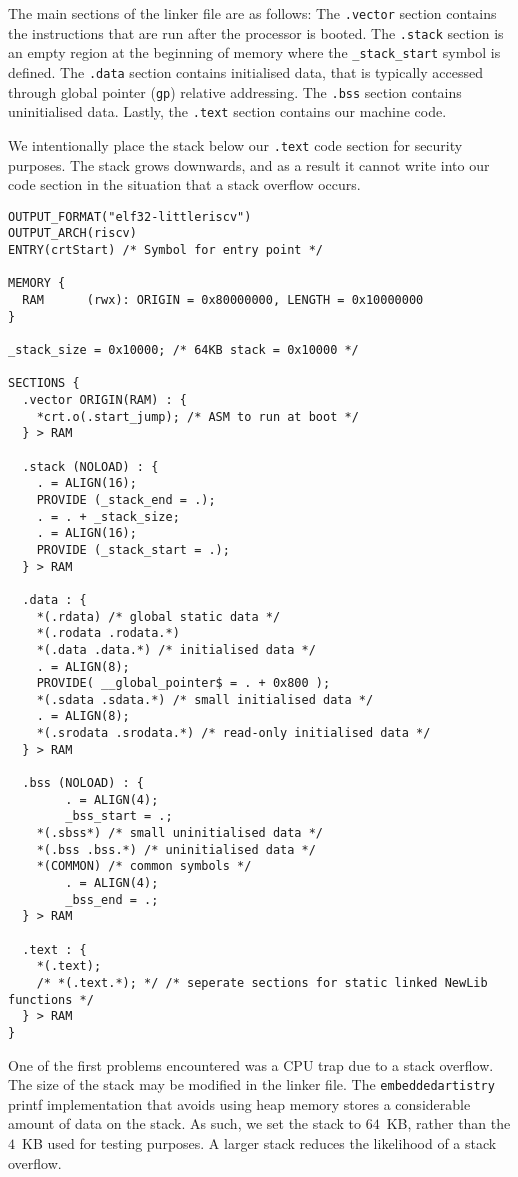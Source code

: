 \documentclass[a4paper,8pt]{report}
\begin{document}
The main sections of the linker file are as follows: The \texttt{.vector}
section contains the instructions that are run after the processor is booted.
The \texttt{.stack} section is an empty region at the beginning of memory
where the \texttt{\_stack\_start} symbol is defined. The \texttt{.data} section
contains initialised data, that is typically accessed through global pointer
(\texttt{gp}) relative addressing. The \texttt{.bss} section contains
uninitialised data. Lastly, the \texttt{.text} section contains our machine
code.

We intentionally place the stack below our \texttt{.text} code section for security
purposes. The stack grows downwards, and as a result it cannot write into our
code section in the situation that a stack overflow occurs.

\scriptsize
\begin{verbatim}
OUTPUT_FORMAT("elf32-littleriscv")
OUTPUT_ARCH(riscv)
ENTRY(crtStart) /* Symbol for entry point */

MEMORY {
  RAM      (rwx): ORIGIN = 0x80000000, LENGTH = 0x10000000
}

_stack_size = 0x10000; /* 64KB stack = 0x10000 */

SECTIONS {
  .vector ORIGIN(RAM) : {
    *crt.o(.start_jump); /* ASM to run at boot */
  } > RAM

  .stack (NOLOAD) : {
    . = ALIGN(16);
    PROVIDE (_stack_end = .);
    . = . + _stack_size;
    . = ALIGN(16);
    PROVIDE (_stack_start = .);
  } > RAM

  .data : {
    *(.rdata) /* global static data */
    *(.rodata .rodata.*)
    *(.data .data.*) /* initialised data */
    . = ALIGN(8);
    PROVIDE( __global_pointer$ = . + 0x800 );
    *(.sdata .sdata.*) /* small initialised data */
    . = ALIGN(8);
    *(.srodata .srodata.*) /* read-only initialised data */
  } > RAM

  .bss (NOLOAD) : {
		. = ALIGN(4);
		_bss_start = .;
    *(.sbss*) /* small uninitialised data */
    *(.bss .bss.*) /* uninitialised data */
    *(COMMON) /* common symbols */
		. = ALIGN(4);
		_bss_end = .;
  } > RAM

  .text : {
    *(.text);
    /* *(.text.*); */ /* seperate sections for static linked NewLib functions */
  } > RAM
}
\end{verbatim}
\normalsize

One of the first problems encountered was a CPU trap due to a stack overflow.
The size of the stack may be modified in the linker file. The \texttt{embeddedartistry}
printf implementation that avoids using heap memory stores a considerable amount
of data on the stack. As such, we set the stack to $64$~KB, rather than the
$4$~KB used for testing purposes. A larger stack reduces the likelihood of a
stack overflow.
\end{document}
